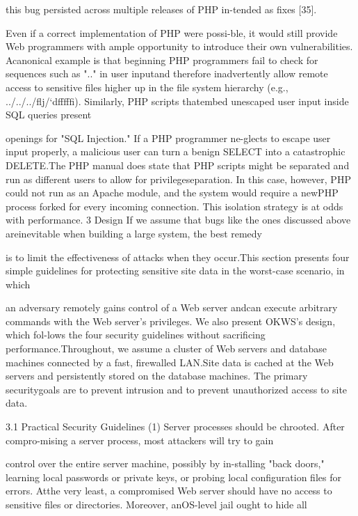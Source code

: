 this bug persisted across multiple releases of PHP in-tended as fixes [35].

Even if a correct implementation of PHP were possi-ble, it would still provide Web programmers with ample opportunity to introduce their own vulnerabilities. Acanonical example is that beginning PHP programmers
fail to check for sequences such as ".." in user inputand therefore inadvertently allow remote access to sensitive files higher up in the file system hierarchy (e.g.,
../../../\Phi flj/`dfffffi\Delta ). Similarly, PHP scripts thatembed unescaped user input inside SQL queries present

openings for "SQL Injection." If a PHP programmer ne-glects to escape user input properly, a malicious user can
turn a benign SELECT into a catastrophic DELETE.The PHP manual does state that PHP scripts might be
separated and run as different users to allow for privilegeseparation. In this case, however, PHP could not run as
an Apache module, and the system would require a newPHP process forked for every incoming connection. This
isolation strategy is at odds with performance.
3 Design
If we assume that bugs like the ones discussed above areinevitable when building a large system, the best remedy

is to limit the effectiveness of attacks when they occur.This section presents four simple guidelines for protecting sensitive site data in the worst-case scenario, in which

an adversary remotely gains control of a Web server andcan execute arbitrary commands with the Web server's
privileges. We also present OKWS's design, which fol-lows the four security guidelines without sacrificing performance.Throughout, we assume a cluster of Web servers and
database machines connected by a fast, firewalled LAN.Site data is cached at the Web servers and persistently
stored on the database machines. The primary securitygoals are to prevent intrusion and to prevent unauthorized
access to site data.

3.1 Practical Security Guidelines
(1) Server processes should be chrooted. After compro-mising a server process, most attackers will try to gain

control over the entire server machine, possibly by in-stalling "back doors," learning local passwords or private
keys, or probing local configuration files for errors. Atthe very least, a compromised Web server should have
no access to sensitive files or directories. Moreover, anOS-level jail ought to hide all

